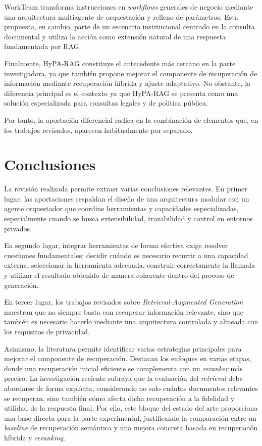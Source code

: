 WorkTeam transforma instrucciones en \textit{workflows} generales de negocio mediante una arquitectura multiagente de orquestación y relleno de parámetros. 
Esta propuesta, en cambio, parte de un escenario institucional centrado en la consulta documental y utiliza la acción como extensión natural de una respuesta fundamentada por RAG. 

Finalmente, HyPA-RAG constituye el antecedente más cercano en la parte investigadora, ya que también propone mejorar el componente de recuperación de información mediante recuperación híbrida y ajuste adaptativo. 
No obstante, la diferencia principal es el contexto ya que HyPA-RAG se presenta como una solución especializada para consultas legales y de política pública.

Por tanto, la aportación diferencial radica en la combinación de elementos que, en los trabajos revisados, aparecen habitualmente por separado. 

\section{Conclusiones}

La revisión realizada permite extraer varias conclusiones relevantes. 
En primer lugar, las aportaciones respaldan el diseño de una arquitectura modular con un agente orquestador que coordine herramientas y capacidades especializadas, especialmente cuando se busca extensibilidad, trazabilidad y control en entornos privados.

En segundo lugar, integrar herramientas de forma efectiva exige resolver cuestiones fundamentales: decidir cuándo es necesario recurrir a una capacidad externa, seleccionar la herramienta adecuada, construir correctamente la llamada y utilizar el resultado obtenido de manera coherente dentro del proceso de generación. 

En tercer lugar, los trabajos revisados sobre \textit{Retrieval-Augmented Generation} muestran que no siempre basta con recuperar información relevante, sino que también es necesario hacerlo mediante una arquitectura controlada y alineada con los requisitos de privacidad.

Asimismo, la literatura permite identificar varias estrategias principales para mejorar el componente de recuperación. 
Destacan los enfoques en varias etapas, donde una recuperación inicial eficiente se complementa con un \textit{reranker} más preciso. 
La investigación reciente subraya que la evaluación del \textit{retrieval} debe abordarse de forma explícita, considerando no solo cuántos documentos relevantes se recuperan, sino también cómo afecta dicha recuperación a la fidelidad y utilidad de la respuesta final. 
Por ello, este bloque del estado del arte proporciona una base directa para la parte experimental, justificando la comparación entre un \textit{baseline} de recuperación semántica y una mejora concreta basada en recuperación híbrida y \textit{reranking}.


